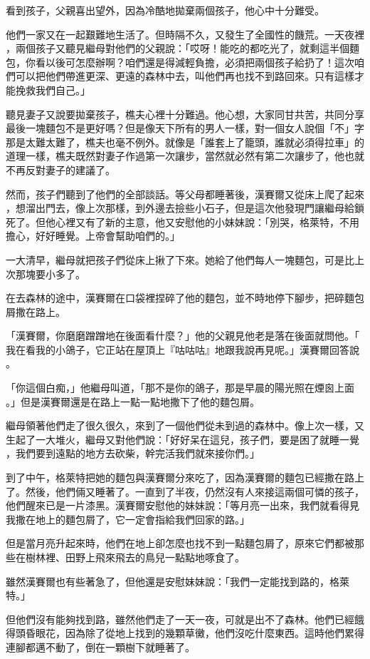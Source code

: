 \documentclass[oneside,11pt]{memoir} %
\begin{document}
看到孩子，父親喜出望外，因為冷酷地拋棄兩個孩子，他心中十分難受。

他們一家又在一起艱難地生活了。但時隔不久，又發生了全國性的饑荒。一天夜裡
，兩個孩子又聽見繼母對他們的父親說：「哎呀！能吃的都吃光了，就剩這半個麵
包，你看以後可怎麼辦啊？咱們還是得減輕負擔，必須把兩個孩子給扔了！這次咱
們可以把他們帶進更深、更遠的森林中去，叫他們再也找不到路回來。只有這樣才
能挽救我們自己。」

聽見妻子又說要拋棄孩子，樵夫心裡十分難過。他心想，大家同甘共苦，共同分享
最後一塊麵包不是更好嗎？但是像天下所有的男人一樣，對一個女人說個「不」字
那是太難太難了，樵夫也毫不例外。就像是「誰套上了籠頭，誰就必須得拉車」的
道理一樣，樵夫既然對妻子作過第一次讓步，當然就必然有第二次讓步了，他也就
不再反對妻子的建議了。

然而，孩子們聽到了他們的全部談話。等父母都睡著後，漢賽爾又從床上爬了起來
，想溜出門去，像上次那樣，到外邊去撿些小石子，但是這次他發現門讓繼母給鎖
死了。但他心裡又有了新的主意，他又安慰他的小妹妹說：「別哭，格萊特，不用
擔心，好好睡覺。上帝會幫助咱們的。」

一大清早，繼母就把孩子們從床上揪了下來。她給了他們每人一塊麵包，可是比上
次那塊要小多了。

在去森林的途中，漢賽爾在口袋裡捏碎了他的麵包，並不時地停下腳步，把碎麵包
屑撒在路上。

「漢賽爾，你磨磨蹭蹭地在後面看什麼？」他的父親見他老是落在後面就問他。「
我在看我的小鴿子，它正站在屋頂上『咕咕咕』地跟我說再見呢。」漢賽爾回答說
。

「你這個白痴，」他繼母叫道，「那不是你的鴿子，那是早晨的陽光照在煙囪上面
。」但是漢賽爾還是在路上一點一點地撒下了他的麵包屑。

繼母領著他們走了很久很久，來到了一個他們從未到過的森林中。像上次一樣，又
生起了一大堆火，繼母又對他們說：「好好呆在這兒，孩子們，要是困了就睡一覺
，我們要到遠點的地方去砍柴，幹完活我們就來接你們。」

到了中午，格萊特把她的麵包與漢賽爾分來吃了，因為漢賽爾的麵包已經撒在路上
了。然後，他們倆又睡著了。一直到了半夜，仍然沒有人來接這兩個可憐的孩子，
他們醒來已是一片漆黑。漢賽爾安慰他的妹妹說：「等月亮一出來，我們就看得見
我撒在地上的麵包屑了，它一定會指給我們回家的路。」

但是當月亮升起來時，他們在地上卻怎麼也找不到一點麵包屑了，原來它們都被那
些在樹林裡、田野上飛來飛去的鳥兒一點點地啄食了。

雖然漢賽爾也有些著急了，但他還是安慰妹妹說：「我們一定能找到路的，格萊特。」

但他們沒有能夠找到路，雖然他們走了一天一夜，可就是出不了森林。他們已經餓
得頭昏眼花，因為除了從地上找到的幾顆草黴，他們沒吃什麼東西。這時他們累得
連腳都邁不動了，倒在一顆樹下就睡著了。
\end{document}
